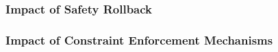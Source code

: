 \subsubsection{Impact of Safety Rollback
\label{sec:evaluation:ablation-safety-rollback}}




\subsubsection{Impact of Constraint Enforcement Mechanisms
\label{sec:evaluation:ablation-constraint-mechanisms}}






